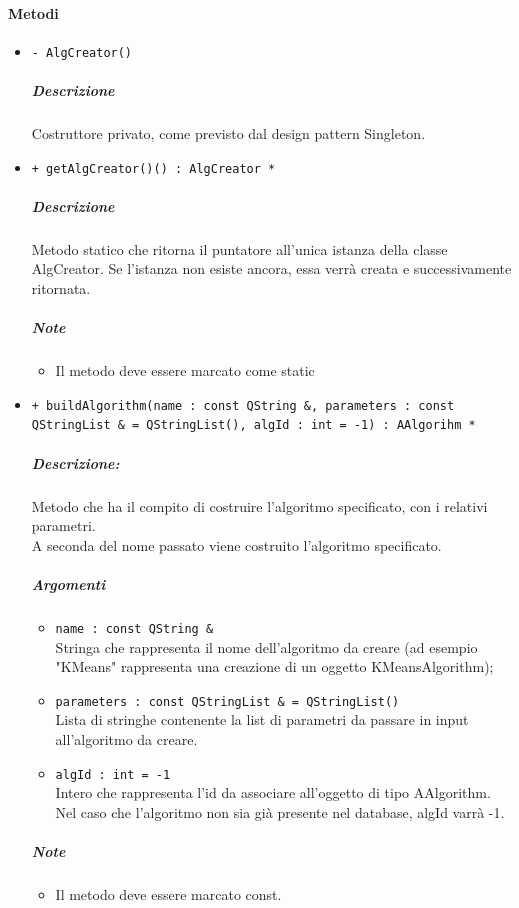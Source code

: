 	\paragraph{\color{black}Metodi}
		\begin{itemize}
			\item \color{blue} \verb!- AlgCreator()!
			\color{black}
			\subparagraph{Descrizione} Costruttore privato, come previsto dal design pattern\g{} Singleton.
			\item \color{blue} \verb!+ getAlgCreator()() : AlgCreator *!
			\color{black}
			\subparagraph{Descrizione} Metodo statico che ritorna il puntatore all’unica istanza della classe AlgCreator. Se l’istanza non esiste ancora, essa verrà creata e successivamente ritornata.
			\subparagraph{Note}
			\begin{itemize}
				\item Il metodo deve essere marcato come static
			\end{itemize}
			\item \color{blue} \verb!+ buildAlgorithm(name : const QString &, parameters : const QStringList & = QStringList(), algId : int = -1) : AAlgorihm *!
			\color{black}
			\subparagraph{Descrizione:} Metodo che ha il compito di costruire l’algoritmo specificato, con i relativi parametri.
\\A seconda del nome passato viene costruito l'algoritmo specificato.
			\color{black}
			\subparagraph{Argomenti}
			\begin{itemize}
				\item \color{RoyalPurple} \verb!name : const QString &!\\				
\color{black} Stringa che rappresenta il nome dell’algoritmo da creare (ad esempio "KMeans" rappresenta una creazione di un oggetto KMeansAlgorithm);
				\item \color{RoyalPurple} \verb!parameters : const QStringList & = QStringList()!\\				
\color{black} Lista di stringhe contenente la list di parametri da passare in input all'algoritmo da creare.
				\item \color{RoyalPurple} \verb!algId : int = -1!\\				
\color{black} Intero che rappresenta l'id da associare all'oggetto di tipo AAlgorithm.
\\Nel caso che l'algoritmo non sia già presente nel database, algId varrà -1.
			\end{itemize}
			\subparagraph{Note}
			\begin{itemize}
				\item Il metodo deve essere marcato const.
			\end{itemize}
		\end{itemize}
